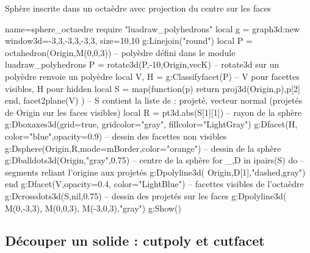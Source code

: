 \begin{itemize}
\begin{demo}{Sphère inscrite dans un octaèdre avec projection du centre sur les faces}
\begin{luadraw}{name=sphere_octaedre}
require "luadraw_polyhedrons"
local g = graph3d:new{ window3d={-3,3,-3,3,-3,3}, size={10,10}}
g:Linejoin("round")
local P = octahedron(Origin,M(0,0,3)) -- polyèdre défini dans le module luadraw_polyhedrons
P = rotate3d(P,-10,{Origin,vecK}) -- rotate3d sur un polyèdre renvoie un polyèdre
local V, H = g:Classifyfacet(P) -- V pour facettes visibles, H pour hidden
local S = map(function(p) return {proj3d(Origin,p),p[2]} end, facet2plane(V) )
-- S contient la liste de : {projeté, vecteur normal} (projetés de Origin sur les faces visibles)
local R = pt3d.abs(S[1][1]) -- rayon de la sphère
g:Dboxaxes3d({grid=true, gridcolor="gray", fillcolor="LightGray"})
g:Dfacet(H, {color="blue",opacity=0.9}) -- dessin des facettes non visibles
g:Dsphere(Origin,R,{mode=mBorder,color="orange"}) -- dessin de la sphère
g:Dballdots3d(Origin,"gray",0.75) -- centre de la sphère
for _,D in ipairs(S) do -- segments reliant l'origine aux projetés
    g:Dpolyline3d( {Origin,D[1]},"dashed,gray")
end
g:Dfacet(V,{opacity=0.4, color="LightBlue"}) -- facettes visibles de l'octaèdre
g:Dcrossdots3d(S,nil,0.75) -- dessin des projetés sur les faces
g:Dpolyline3d( {M(0,-3,3), M(0,0,3), M(-3,0,3)},"gray")
g:Show()            
\end{luadraw}
\end{demo}
\end{itemize}

\subsection{Découper un solide : cutpoly et cutfacet}

